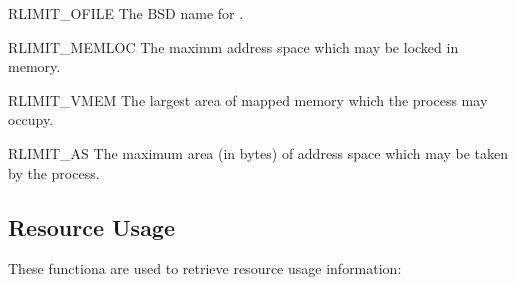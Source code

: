 \begin{datadesc}{RLIMIT_OFILE}
  The BSD name for .
\end{datadesc}

\begin{datadesc}{RLIMIT_MEMLOC}
  The maximm address space which may be locked in memory.
\end{datadesc}

\begin{datadesc}{RLIMIT_VMEM}
  The largest area of mapped memory which the process may occupy.
\end{datadesc}

\begin{datadesc}{RLIMIT_AS}
  The maximum area (in bytes) of address space which may be taken by
  the process.
\end{datadesc}

\subsection{Resource Usage}

These functiona are used to retrieve resource usage information:

